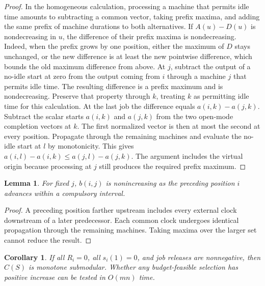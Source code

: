 \documentclass[11pt,letterpaper]{article}
\newtheorem{lemma}{Lemma}
\newtheorem{corollary}{Corollary}
\begin{document}
\begin{proof}
In the homogeneous calculation, processing a machine that permits idle time amounts to subtracting a common vector, taking prefix maxima, and adding the same prefix of machine durations to both alternatives. If $A(u)-D(u)$ is nondecreasing in $u$, the difference of their prefix maxima is nondecreasing. Indeed, when the prefix grows by one position, either the maximum of $D$ stays unchanged, or the new difference is at least the new pointwise difference, which bounds the old maximum difference from above. At $j$, subtract the output of a no-idle start at zero from the output coming from $i$ through a machine $j$ that permits idle time. The resulting difference is a prefix maximum and is nondecreasing. Preserve that property through $k$, treating $k$ as permitting idle time for this calculation. At the last job the difference equals $a(i,k)-a(j,k)$. Subtract the scalar starts $a(i,k)$ and $a(j,k)$ from the two open-mode completion vectors at $k$. The first normalized vector is then at most the second at every position. Propagate through the remaining machines and evaluate the no-idle start at $l$ by monotonicity. This gives $a(i,l)-a(i,k)\le a(j,l)-a(j,k)$. The argument includes the virtual origin because processing at $j$ still produces the required prefix maximum.
\end{proof}

\begin{lemma}
\label{lem:monotone}
For fixed $j$, $b(i,j)$ is nonincreasing as the preceding position $i$ advances within a compulsory interval.
\end{lemma}

\begin{proof}
A preceding position farther upstream includes every external clock downstream of a later predecessor. Each common clock undergoes identical propagation through the remaining machines. Taking maxima over the larger set cannot reduce the result.
\end{proof}

\begin{corollary}
\label{cor:submod}
If all $R_i=0$, all $s_i(1)=0$, and job releases are nonnegative, then $C(S)$ is monotone submodular. Whether any budget-feasible selection has positive increase can be tested in $O(mn)$ time.
\end{corollary}
\end{document}
